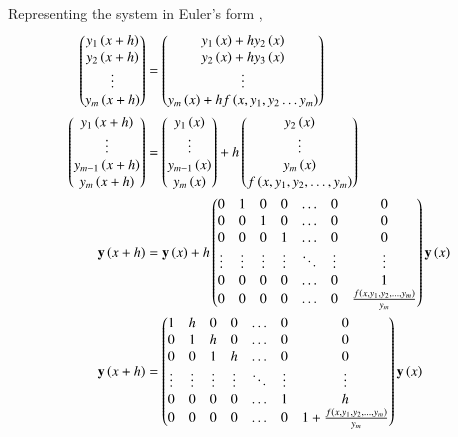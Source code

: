 \documentclass[journal]{IEEEtran}
\begin{document}
Representing the system in Euler's form ,
\begin{align}
    \begin{pmatrix}y_1\left(x + h\right)\\y_2\left(x + h\right)\\\vdots\\y_m\left(x + h\right)\end{pmatrix} &= \begin{pmatrix}y_1\left(x\right) + hy_2\left(x\right)\\y_2\left(x\right) + hy_3\left(x\right)\\\vdots\\y_m\left(x\right) + hf\left(x, y_1, y_2 \dots y_m\right)\end{pmatrix}\\
    \begin{pmatrix}y_1\left(x+h\right) \\ \vdots \\ y_{m-1}\left(x+h\right) \\ y_m\left(x+h\right)\end{pmatrix} &=\begin{pmatrix}y_1\left(x\right) \\ \vdots \\ y_{m-1}\left(x\right) \\ y_m\left(x\right)\end{pmatrix} + h\begin{pmatrix}y_2\left(x\right) \\ \vdots \\ y_m\left(x\right) \\f\left(x, y_1, y_2, \dots, y_m\right) \end{pmatrix}\\
    \mathbf{y}\left(x+h\right) &= \mathbf{y}\left(x\right) + h\begin{pmatrix}0 & 1 & 0 & 0 & \dots & 0 & 0\\ 0 & 0 & 1 & 0 & \dots & 0 & 0\\0 & 0 & 0 & 1 & \dots & 0 & 0\\\vdots & \vdots & \vdots & \vdots& \ddots & \vdots & \vdots\\ 0 & 0 & 0 & 0 & \dots & 0 & 1\\0 & 0 & 0 & 0 & \dots & 0 &\frac{f\left(x, y_1, y_2, \dots, y_m\right)}{y_m}\end{pmatrix}\mathbf{y}\left(x\right)\\
    \mathbf{y}\left(x+h\right) &= \begin{pmatrix}1 & h & 0 & 0 & \dots & 0 & 0\\ 0 & 1 & h & 0 & \dots & 0 & 0\\0 & 0 & 1 & h & \dots & 0 & 0\\\vdots & \vdots & \vdots & \vdots& \ddots & \vdots & \vdots\\ 0 & 0 & 0 & 0 & \dots & 1 & h\\0 & 0 & 0 & 0 & \dots & 0 & 1+\frac{f\left(x, y_1, y_2, \dots, y_m\right)}{y_m}\end{pmatrix}\mathbf{y}\left(x\right)
\end{align}
\end{document}
